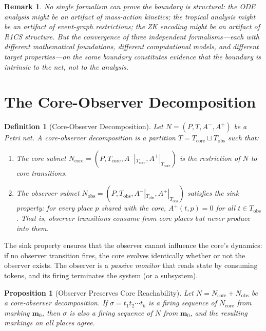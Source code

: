 \documentclass[11pt,a4paper]{article}
\newtheorem{definition}[theorem]{Definition}
\newtheorem{remark}[theorem]{Remark}
\newtheorem{proposition}[theorem]{Proposition}
\begin{document}
\begin{remark}
No single formalism can prove the boundary is structural: the ODE analysis might be an artifact of mass-action kinetics; the tropical analysis might be an artifact of event-graph restrictions; the ZK encoding might be an artifact of R1CS structure.
But the convergence of three independent formalisms---each with different mathematical foundations, different computational models, and different target properties---on the \emph{same} boundary constitutes evidence that the boundary is intrinsic to the net, not to the analysis.
\end{remark}

\section{The Core-Observer Decomposition}
\label{sec:decomposition}

\begin{definition}[Core-Observer Decomposition]
\label{def:decomposition}
Let $N = (P, T, A^-, A^+)$ be a Petri net.
A \emph{core-observer decomposition} is a partition $T = T_{\mathrm{core}} \sqcup T_{\mathrm{obs}}$ such that:
\begin{enumerate}
  \item The \emph{core subnet} $N_{\mathrm{core}} = (P, T_{\mathrm{core}}, A^-|_{T_{\mathrm{core}}}, A^+|_{T_{\mathrm{core}}})$ is the restriction of $N$ to core transitions.
  \item The \emph{observer subnet} $N_{\mathrm{obs}} = (P, T_{\mathrm{obs}}, A^-|_{T_{\mathrm{obs}}}, A^+|_{T_{\mathrm{obs}}})$ satisfies the \emph{sink property}: for every place $p$ shared with the core, $A^+(t, p) = 0$ for all $t \in T_{\mathrm{obs}}$.
  That is, observer transitions consume from core places but never produce into them.
\end{enumerate}
\end{definition}

The sink property ensures that the observer cannot influence the core's dynamics: if no observer transition fires, the core evolves identically whether or not the observer exists.
The observer is a \emph{passive monitor} that reads state by consuming tokens, and its firing terminates the system (or a subsystem).

\begin{proposition}[Observer Preserves Core Reachability]
\label{prop:reachability}
Let $N = N_{\mathrm{core}} + N_{\mathrm{obs}}$ be a core-observer decomposition.
If $\sigma = t_1 t_2 \cdots t_k$ is a firing sequence of $N_{\mathrm{core}}$ from marking $\mathbf{m}_0$, then $\sigma$ is also a firing sequence of $N$ from $\mathbf{m}_0$, and the resulting markings on all places agree.
\end{proposition}
\end{document}
